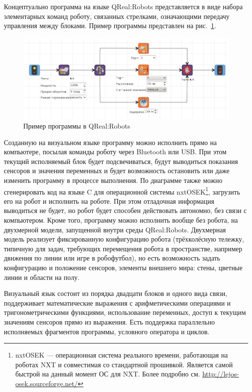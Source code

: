 \documentclass[a4]{article}
\begin{document}
Концептуально программа на языке QReal:Robots представляется в виде набора элементарных команд роботу, связанных стрелками, означающими передачу управления между блоками. Пример программы представлен на рис.~\ref{fig2}.

\begin{figure} [ht]
  \begin{center}
    \includegraphics[width=1.0\textwidth]{fig2-qreal-robots.png}
    \caption{Пример программы в QReal:Robots}
    \label{fig2}
  \end{center}
\end{figure}

Созданную на визуальном языке программу можно исполнить прямо на компьютере, посылая команды роботу через Bluetooth или USB. При этом текущий исполняемый блок будет подсвечиваться, будут выводиться показания сенсоров и значения переменных и будет возможность остановить или даже изменить программу в процессе выполнения. По диаграмме также можно сгенерировать код на языке C для операционной системы nxtOSEK\footnote{nxtOSEK --- операционная система реального времени, работающая на роботах NXT и совместимая со стандартной прошивкой. Является самой быстрой на данный момент ОС для NXT. Более подробно см. \url{http://lejos-osek.sourceforge.net/}}, загрузить его на робот и исполнить на роботе. При этом отладочная информация выводиться не будет, но робот будет способен действовать автономно, без связи с компьютером. Кроме того, программу можно исполнить вообще без робота, на двухмерной модели, запущенной внутри среды QReal:Robots. Двухмерная модель реализует фиксированную конфигурацию робота (трёхколёсную тележку, типичную для задач, требующих перемещения робота в пространстве, например движения по линии или игре в робофутбол), но есть возможность задать конфигурацию и положение сенсоров, элементы внешнего мира: стены, цветные линии и области на полу. 

Визуальный язык состоит из порядка двадцати блоков и одного вида связи, поддерживает математические выражения с арифметическими операциями и тригонометрическими функциями, использование переменных, доступ к текущим значениям сенсоров прямо из выражения. Есть поддержка параллельно исполняемых фрагментов программы, условного оператора и циклов. 
\end{document}
